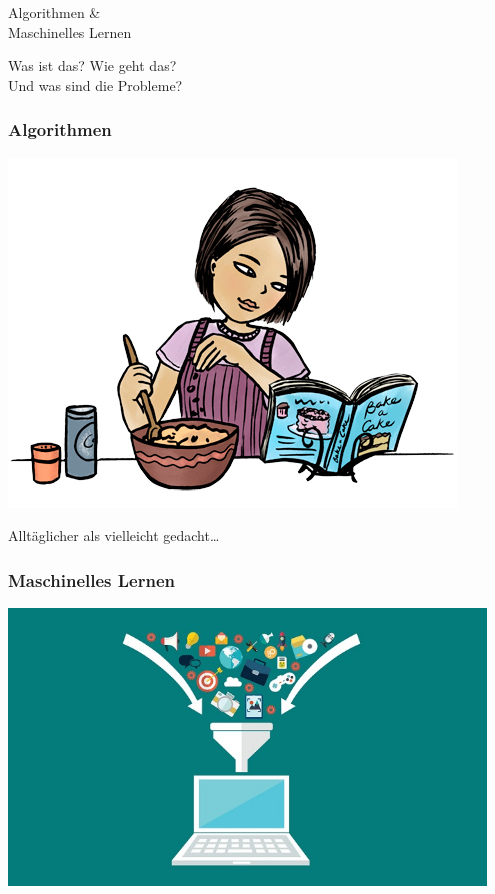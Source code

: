 \documentclass[aspectratio=43,x11names]{beamer}
\begin{document}
\begin{frame}
\begin{center}
\huge
Algorithmen \&\\
Maschinelles Lernen
\bigskip

\large
Was ist das? Wie geht das?\\ Und was sind die Probleme?
\end{center}
\end{frame}

\begin{frame}
\frametitle{Algorithmen}
\begin{center}
\includegraphics[height=0.7\textheight, keepaspectratio]{images/recipe}

Alltäglicher als vielleicht gedacht\dots
\end{center}
\end{frame}


\begin{frame}
\frametitle{Maschinelles Lernen}
\begin{center}
\includegraphics[width=0.95\textwidth, keepaspectratio]{images/funnel}
\end{center}
\end{frame}
\end{document}
